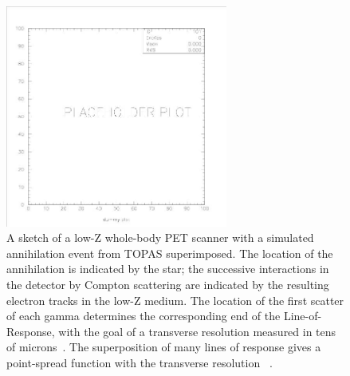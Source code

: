 

%
%
\begin{figure}[!ht]
\centering
\includegraphics[angle=0,width=0.65\textwidth]{Figures/dummy.jpg}
\caption{A sketch of a low-Z whole-body PET scanner with a simulated annihilation event from TOPAS superimposed. The location of the annihilation is indicated by the star; the successive interactions in the detector by Compton scattering are indicated by the resulting electron tracks in the low-Z medium. The location of the first scatter of each gamma determines the corresponding end of the Line-of-Response, with the goal of a transverse resolution measured in tens of microns~\cite{PET_NIM_paper}. The superposition of many lines of response gives a point-spread function with the transverse resolution~\cite{PET_NIM_paper}
.}
\label{fig:Detector_end_view}
\end{figure}


